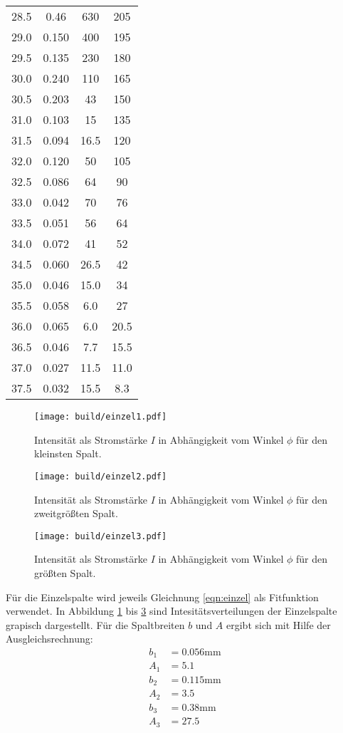 \begin{table}
\begin{tabular}{c c c c}
28.5 & 0.46 & 630 & 205 \\
29.0 & 0.150 & 400 & 195 \\
29.5 & 0.135 & 230 & 180 \\
30.0 & 0.240 & 110 & 165 \\
30.5 & 0.203 & 43 & 150 \\
31.0 & 0.103 & 15 & 135 \\
31.5 & 0.094 & 16.5 & 120 \\
32.0 & 0.120 & 50 & 105 \\
32.5 & 0.086 & 64 & 90 \\
33.0 & 0.042 & 70 & 76 \\
33.5 & 0.051 & 56 & 64 \\
34.0 & 0.072 & 41 & 52 \\
34.5 & 0.060 & 26.5 & 42 \\
35.0 & 0.046 & 15.0 & 34 \\
35.5 & 0.058 & 6.0 & 27 \\
36.0 & 0.065 & 6.0  & 20.5 \\
36.5 & 0.046 & 7.7  & 15.5 \\
37.0 & 0.027 & 11.5 & 11.0 \\
37.5 & 0.032 & 15.5 & 8.3 \\
\bottomrule
\end{tabular}
\end{table}

\begin{figure}
  \centering
  \texttt{[image: build/einzel1.pdf]}
  \caption{Intensität als Stromstärke $I$ in Abhängigkeit vom Winkel $\phi$ für den kleinsten Spalt.}
  \label{fig:einzel1}
\end{figure}

\begin{figure}
  \centering
  \texttt{[image: build/einzel2.pdf]}
  \caption{Intensität als Stromstärke $I$ in Abhängigkeit vom Winkel $\phi$ für den zweitgrößten Spalt.}
  \label{fig:einzel2}
\end{figure}

\begin{figure}
  \centering
  \texttt{[image: build/einzel3.pdf]}
  \caption{Intensität als Stromstärke $I$ in Abhängigkeit vom Winkel $\phi$ für den größten Spalt.}
  \label{fig:einzel3}
\end{figure}

Für die Einzelspalte wird jeweils Gleichnung \ref{eqn:einzel} als Fitfunktion verwendet. In Abbildung \ref{fig:einzel1} bis \ref{fig:einzel3} sind Intesitätsverteilungen der Einzelspalte grapisch dargestellt.
Für die Spaltbreiten $b$ und $A$ ergibt sich mit Hilfe der Ausgleichsrechnung:
\begin{align}
  b_1 &= 0.056 \si{\milli\meter} \\
  A_1 &= 5.1 \\
  b_2 &= 0.115 \si{\milli\meter}\\
  A_2 &= 3.5 \\
  b_3 &= 0.38 \si{\milli\meter} \\
  A_3 &= 27.5 \\
\end{align}

